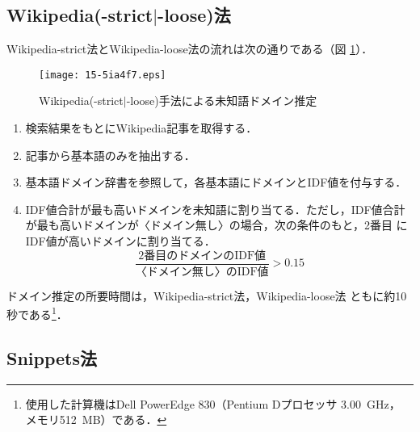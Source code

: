 \documentclass[japanese]{jnlp_1.4}
\begin{document}
\subsection{Wikipedia(-strict$|$-loose)法}

Wikipedia-strict法とWikipedia-loose法の流れは次の通りである（図
\ref{Wikipedia-pic}）．

\begin{figure}[t]
\begin{center}
\texttt{[image: 15-5ia4f7.eps]}
\end{center}
\caption{Wikipedia(-strict$|$-loose)手法による未知語ドメイン推定}
\label{Wikipedia-pic}
\end{figure}

\begin{enumerate}
 \item 検索結果をもとにWikipedia記事を取得する．
 \item 記事から基本語のみを抽出する．
 \item 基本語ドメイン辞書を参照して，各基本語にドメインとIDF値を付与する．
 \item IDF値合計が最も高いドメインを未知語に割り当てる．ただし，IDF値合計
       が最も高いドメインが〈ドメイン無し〉の場合，次の条件のもと，2番目
       にIDF値が高いドメインに割り当てる．
       $$\frac{\textrm{2番目のドメインのIDF値}}{\textrm{〈ドメイン無し〉のIDF値}}>0.15$$
\end{enumerate}

ドメイン推定の所要時間は，Wikipedia-strict法，Wikipedia-loose法
ともに約10秒である\footnote{
使用した計算機はDell PowerEdge 830（Pentium Dプロセッサ 3.00~GHz，
メモリ512~MB）である．
}．


\subsection{Snippets法}
\end{document}
